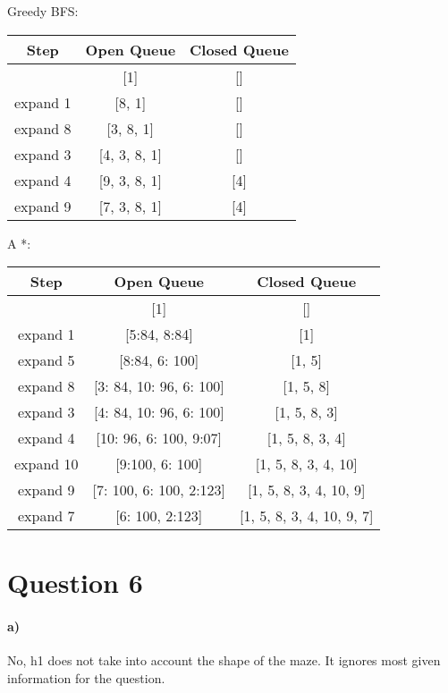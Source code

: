 \documentclass[12pt]{article}
\begin{document}
Greedy BFS:
\begin{center}
  \begin{tabular}{|c|c|c|}
    \hline
    \textbf{Step} & \textbf{Open Queue} & \textbf{Closed Queue} \\ \hline
     & [1] & [] \\ \hline
    expand 1 & [8, 1] & [] \\ \hline
    expand 8 & [3, 8, 1] & [] \\ \hline
    expand 3 & [4, 3, 8, 1] & [] \\ \hline
    expand 4 & [9, 3, 8, 1] & [4] \\ \hline
    expand 9 & [7, 3, 8, 1] & [4] \\ \hline
  \end{tabular}
\end{center}

A *:
\begin{center}
  \begin{tabular}{|c|c|c|}
    \hline
    \textbf{Step} & \textbf{Open Queue} & \textbf{Closed Queue} \\ \hline
     & [1] & [] \\ \hline
    expand 1 & [5:84, 8:84] & [1] \\ \hline
    expand 5 & [8:84, 6: 100] & [1, 5] \\ \hline
    expand 8 & [3: 84, 10: 96, 6: 100] & [1, 5, 8] \\ \hline
    expand 3 & [4: 84, 10: 96, 6: 100] & [1, 5, 8, 3] \\ \hline
    expand 4 & [10: 96, 6: 100, 9:07] & [1, 5, 8, 3, 4] \\ \hline
    expand 10 & [9:100, 6: 100] & [1, 5, 8, 3, 4, 10] \\ \hline
    expand 9 & [7: 100, 6: 100, 2:123] & [1, 5, 8, 3, 4, 10, 9] \\ \hline
    expand 7 & [6: 100, 2:123] & [1, 5, 8, 3, 4, 10, 9, 7] \\ \hline
  \end{tabular}
\end{center}


\section*{Question 6} %
\label{sec:question_6}
\paragraph{a)} %
\label{par:a_}
No, h1 does not take into account the shape of the maze. It ignores most given information for the question.
\end{document}
